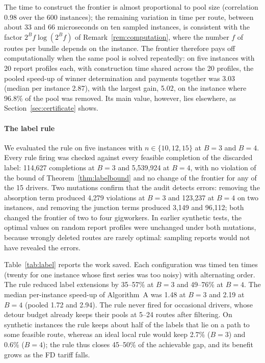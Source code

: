 \documentclass[review,12pt]{elsarticle}
\theoremstyle{definition}
\theoremstyle{remark}
\begin{document}
The time to construct the frontier is almost proportional to pool size
(correlation 0.98 over the 600 instances); the remaining variation in time
per route, between about 33 and 66 microseconds on ten sampled instances, is
consistent with the factor $2^Bf\log(2^Bf)$ of Remark~\ref{rem:computation},
where the number $f$ of routes per bundle depends on the instance. The
frontier therefore pays off computationally when the same pool is solved
repeatedly: on five instances with 20 report profiles each, with construction
time shared across the 20 profiles, the pooled speed-up of winner
determination and payments together was 3.03 (median per instance 2.87),
with the largest gain, 5.02, on the instance where 96.8\% of the pool was
removed. Its main value, however, lies elsewhere, as
Section~\ref{sec:certificate} shows.

\paragraph{The label rule} We evaluated the rule on five instances with
$n\in\{10,12,15\}$ at $B=3$ and $B=4$. Every rule firing was checked against
every feasible completion of the discarded label: 114,627 completions at
$B=3$ and 5,539,924 at $B=4$, with no violation of the bound of
Theorem~\ref{thm:labelbound} and no change of the frontier for any of the 15
drivers. Two mutations confirm that the audit detects errors: removing the
absorption term produced 4,279 violations at $B=3$ and 123,237 at $B=4$ on
two instances, and removing the junction terms produced 3,149 and 96,112;
both changed the frontier of two to four gigworkers. In earlier synthetic
tests, the optimal values on random report profiles were unchanged under
both mutations, because wrongly deleted routes are rarely optimal: sampling
reports would not have revealed the errors.

Table~\ref{tab:label} reports the work saved. Each configuration was timed
ten times (twenty for one instance whose first series was too noisy) with
alternating order. The rule reduced label extensions by 35--57\% at $B=3$
and 49--76\% at $B=4$. The median per-instance speed-up of Algorithm~A was
1.48 at $B=3$ and 2.19 at $B=4$ (pooled 1.72 and 2.94). The rule never fired
for occasional drivers, whose detour budget already keeps their pools at
5--24 routes after filtering. On synthetic instances the rule keeps about
half of the labels that lie on a path to some feasible route, whereas an
ideal local rule would keep 2.7\% ($B=3$) and 0.6\% ($B=4$); the rule thus
closes 45--50\% of the achievable gap, and its benefit grows as the FD tariff
falls.
\end{document}
